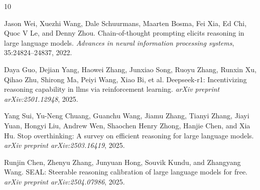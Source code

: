 \documentclass{article}
\begin{document}
\begin{thebibliography}{10}

Jason Wei, Xuezhi Wang, Dale Schuurmans, Maarten Bosma, Fei Xia, Ed Chi, Quoc V Le, and Denny Zhou.
Chain-of-thought prompting elicits reasoning in large language models.
\textit{Advances in neural information processing systems}, 35:24824--24837, 2022.

Daya Guo, Dejian Yang, Haowei Zhang, Junxiao Song, Ruoyu Zhang, Runxin Xu, Qihao Zhu, Shirong Ma, Peiyi Wang, Xiao Bi, et al.
Deepseek-r1: Incentivizing reasoning capability in llms via reinforcement learning.
\textit{arXiv preprint arXiv:2501.12948}, 2025.

Yang Sui, Yu-Neng Chuang, Guanchu Wang, Jiamu Zhang, Tianyi Zhang, Jiayi Yuan, Hongyi Liu, Andrew Wen, Shaochen Henry Zhong, Hanjie Chen, and Xia Hu.
Stop overthinking: A survey on efficient reasoning for large language models.
\textit{arXiv preprint arXiv:2503.16419}, 2025.

Runjin Chen, Zhenyu Zhang, Junyuan Hong, Souvik Kundu, and Zhangyang Wang.
SEAL: Steerable reasoning calibration of large language models for free.
\textit{arXiv preprint arXiv:2504.07986}, 2025.

\end{thebibliography}
\end{document}
